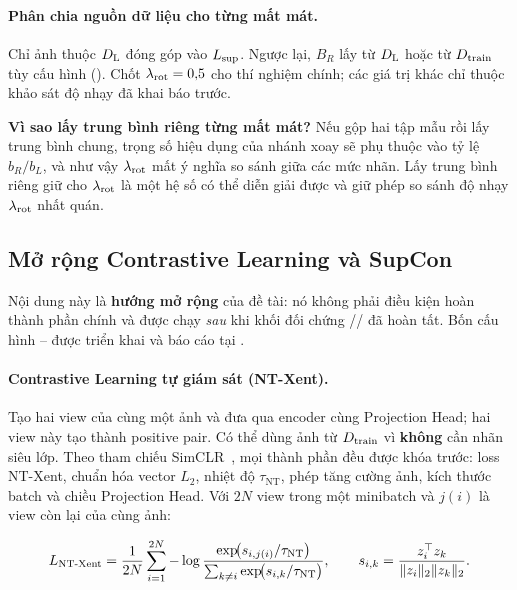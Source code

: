 \paragraph{Phân chia nguồn dữ liệu cho từng mất mát.}
Chỉ ảnh thuộc $D_{\mathrm{L}}$ đóng góp vào $L_{\mathrm{sup}}$. Ngược lại, $B_R$ lấy từ $D_{\mathrm{L}}$ hoặc từ $D_{\mathrm{train}}$ tùy
cấu hình (). Chốt $\lambda_{\mathrm{rot}} = 0{,}5$ cho thí nghiệm chính; các giá trị khác
chỉ thuộc khảo sát độ nhạy đã khai báo trước.

\begin{keybox}
\textbf{Vì sao lấy trung bình riêng từng mất mát?} Nếu gộp hai tập mẫu rồi lấy trung bình chung,
trọng số hiệu dụng của nhánh xoay sẽ phụ thuộc vào tỷ lệ $b_R/b_L$, và như vậy $\lambda_{\mathrm{rot}}$ mất ý
nghĩa so sánh giữa các mức nhãn. Lấy trung bình riêng giữ cho $\lambda_{\mathrm{rot}}$ là một hệ số có thể
diễn giải được và giữ phép so sánh độ nhạy $\lambda_{\mathrm{rot}}$ nhất quán.
\end{keybox}

\subsection{Mở rộng Contrastive Learning và SupCon}
\label{sec:contrastive}

Nội dung này là \textbf{hướng mở rộng} của đề tài: nó không phải điều kiện hoàn thành phần
chính và được chạy \emph{sau} khi khối đối chứng // đã hoàn tất.
Bốn cấu hình -- được triển khai và báo cáo tại .

\paragraph{Contrastive Learning tự giám sát (NT-Xent).}
Tạo hai view của cùng một ảnh và đưa qua encoder cùng Projection Head; hai view này tạo thành
positive pair. Có thể dùng ảnh từ $D_{\mathrm{train}}$ vì \textbf{không} cần nhãn siêu lớp. Theo tham chiếu
SimCLR~\cite{chen2020simclr}, mọi thành phần đều được khóa trước: loss NT-Xent, chuẩn hóa vector
$L_2$, nhiệt độ $\tau_{\mathrm{NT}}$, phép tăng cường ảnh, kích thước batch và chiều Projection
Head. Với $2N$ view trong một minibatch và $j(i)$ là view còn lại của cùng ảnh:

\begin{equation}
  L_{\mathrm{NT\text{-}Xent}}
  = \frac{1}{2N}\sum_{i=1}^{2N} -\log
    \frac{\exp\!\bigl(s_{i,j(i)}/\tau_{\mathrm{NT}}\bigr)}
         {\sum_{k \neq i} \exp\!\bigl(s_{i,k}/\tau_{\mathrm{NT}}\bigr)},
  \qquad
  s_{i,k} = \frac{z_i^{\top} z_k}{\lVert z_i\rVert_2 \lVert z_k\rVert_2}.
  \label{eq:ntxent}
\end{equation}

